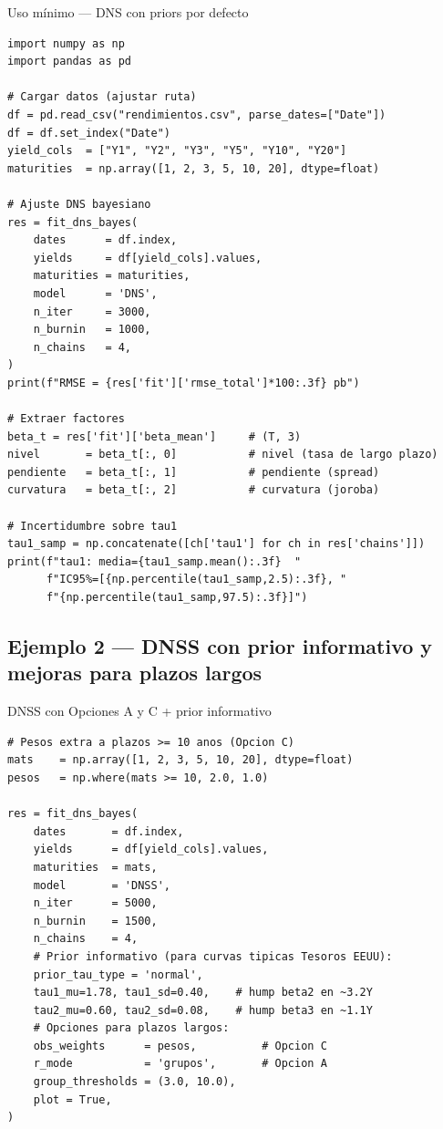 \documentclass[12pt, a4paper]{article}
\theoremstyle{plain}
\theoremstyle{definition}
\theoremstyle{remark}
\begin{document}
\begin{codigocaja}{Uso mínimo — DNS con priors por defecto}
\begin{lstlisting}
import numpy as np
import pandas as pd

# Cargar datos (ajustar ruta)
df = pd.read_csv("rendimientos.csv", parse_dates=["Date"])
df = df.set_index("Date")
yield_cols  = ["Y1", "Y2", "Y3", "Y5", "Y10", "Y20"]
maturities  = np.array([1, 2, 3, 5, 10, 20], dtype=float)

# Ajuste DNS bayesiano
res = fit_dns_bayes(
    dates      = df.index,
    yields     = df[yield_cols].values,
    maturities = maturities,
    model      = 'DNS',
    n_iter     = 3000,
    n_burnin   = 1000,
    n_chains   = 4,
)
print(f"RMSE = {res['fit']['rmse_total']*100:.3f} pb")

# Extraer factores
beta_t = res['fit']['beta_mean']     # (T, 3)
nivel       = beta_t[:, 0]           # nivel (tasa de largo plazo)
pendiente   = beta_t[:, 1]           # pendiente (spread)
curvatura   = beta_t[:, 2]           # curvatura (joroba)

# Incertidumbre sobre tau1
tau1_samp = np.concatenate([ch['tau1'] for ch in res['chains']])
print(f"tau1: media={tau1_samp.mean():.3f}  "
      f"IC95%=[{np.percentile(tau1_samp,2.5):.3f}, "
      f"{np.percentile(tau1_samp,97.5):.3f}]")
\end{lstlisting}
\end{codigocaja}

\subsection{Ejemplo 2 — DNSS con prior informativo y mejoras para plazos largos}

\begin{codigocaja}{DNSS con Opciones A y C + prior informativo}
\begin{lstlisting}
# Pesos extra a plazos >= 10 anos (Opcion C)
mats    = np.array([1, 2, 3, 5, 10, 20], dtype=float)
pesos   = np.where(mats >= 10, 2.0, 1.0)

res = fit_dns_bayes(
    dates       = df.index,
    yields      = df[yield_cols].values,
    maturities  = mats,
    model       = 'DNSS',
    n_iter      = 5000,
    n_burnin    = 1500,
    n_chains    = 4,
    # Prior informativo (para curvas tipicas Tesoros EEUU):
    prior_tau_type = 'normal',
    tau1_mu=1.78, tau1_sd=0.40,    # hump beta2 en ~3.2Y
    tau2_mu=0.60, tau2_sd=0.08,    # hump beta3 en ~1.1Y
    # Opciones para plazos largos:
    obs_weights      = pesos,          # Opcion C
    r_mode           = 'grupos',       # Opcion A
    group_thresholds = (3.0, 10.0),
    plot = True,
)
\end{lstlisting}
\end{codigocaja}
\end{document}
